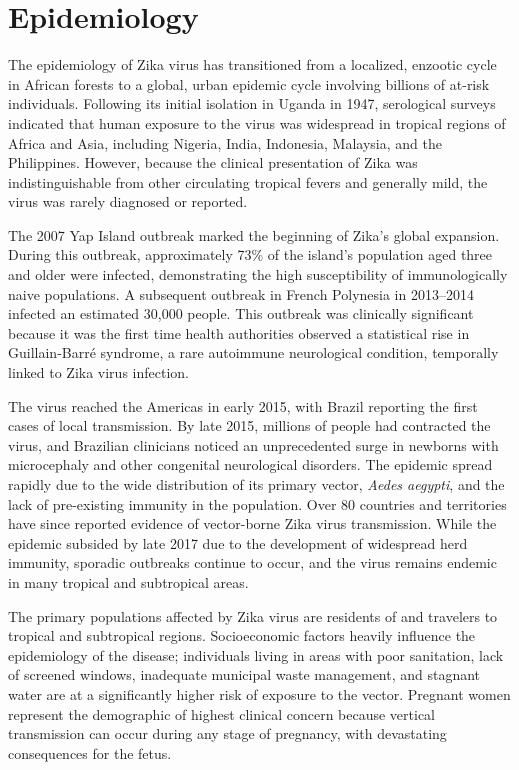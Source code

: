 \section*{Epidemiology}
The epidemiology of Zika virus has transitioned from a localized, enzootic cycle in African forests to a global, urban epidemic cycle involving billions of at-risk individuals. Following its initial isolation in Uganda in 1947, serological surveys indicated that human exposure to the virus was widespread in tropical regions of Africa and Asia, including Nigeria, India, Indonesia, Malaysia, and the Philippines. However, because the clinical presentation of Zika was indistinguishable from other circulating tropical fevers and generally mild, the virus was rarely diagnosed or reported.

The 2007 Yap Island outbreak marked the beginning of Zika's global expansion. During this outbreak, approximately 73\% of the island's population aged three and older were infected, demonstrating the high susceptibility of immunologically naive populations. A subsequent outbreak in French Polynesia in 2013--2014 infected an estimated 30,000 people. This outbreak was clinically significant because it was the first time health authorities observed a statistical rise in Guillain-Barr\'e syndrome, a rare autoimmune neurological condition, temporally linked to Zika virus infection.

The virus reached the Americas in early 2015, with Brazil reporting the first cases of local transmission. By late 2015, millions of people had contracted the virus, and Brazilian clinicians noticed an unprecedented surge in newborns with microcephaly and other congenital neurological disorders. The epidemic spread rapidly due to the wide distribution of its primary vector, \textit{Aedes aegypti}, and the lack of pre-existing immunity in the population. Over 80 countries and territories have since reported evidence of vector-borne Zika virus transmission. While the epidemic subsided by late 2017 due to the development of widespread herd immunity, sporadic outbreaks continue to occur, and the virus remains endemic in many tropical and subtropical areas.

The primary populations affected by Zika virus are residents of and travelers to tropical and subtropical regions. Socioeconomic factors heavily influence the epidemiology of the disease; individuals living in areas with poor sanitation, lack of screened windows, inadequate municipal waste management, and stagnant water are at a significantly higher risk of exposure to the vector. Pregnant women represent the demographic of highest clinical concern because vertical transmission can occur during any stage of pregnancy, with devastating consequences for the fetus.

